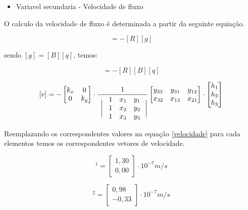 \documentclass{article} %
\begin{document}
\begin{itemize}
	\item Variavel secundaria - Velocidade de fluxo
\end{itemize}


O calculo da velocidade de fluxo é determinada a partir da seguinte equiação.

\begin{equation}
[v]=-[R][g]
\end{equation}

sendo \([g]=[B][q]\), temos:

\begin{equation}
[v]=-[R][B][q]
\end{equation}

\begin{equation}\label{velocidade}
[v]=-\begin{bmatrix}
k_x&0\\
0&k_y
\end{bmatrix}\cdot\frac{1}{\hspace{4pt}\biggr|\color{white}\begin{bmatrix}\color{black}
	1&\color{black}x_1&\color{black}y_1\\\color{black}1&\color{black}x_2&\color{black}y_2\\\color{black}1&\color{black}x_3&\color{black}y_3
	\color{white}\end{bmatrix}\color{black}\biggr|}\begin{bmatrix}
y_{23}&y_{31}&y_{12}\\x_{32}&x_{13}&x_{21}
\end{bmatrix}\cdot \begin{bmatrix}
h_1\\
h_2\\
h_3
\end{bmatrix}
\end{equation}

 Reemplazando os correspondentes valores na equação \ref{velocidade} para cada elementos temos os correspondentes vetores de velocidade.
 
 
 \begin{equation}
 [v]^{1}=\begin{bmatrix}
1,30\\
0,00
 \end{bmatrix}\cdot 10^{-7}m/s
 \end{equation}
 
 \begin{equation}
[v]^{2}=\begin{bmatrix}
0,98\\
-0,33
\end{bmatrix}\cdot 10^{-7}m/s
\end{equation}
\end{document}
